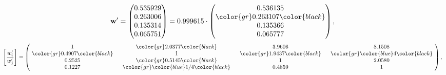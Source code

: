 \begin{example}
\begin{equation*}
\mathbf{w}^{\prime} =
\begin{pmatrix}
0.535929\\
0.263006\\
0.135314\\
0.065751
\end{pmatrix} =
0.999615\cdot
\begin{pmatrix}
0.536135\\
\color{gr} 0.263107\color{black} \\
0.135366\\
0.065777
\end{pmatrix},
\end{equation*}
\begin{equation*}
\left[ \frac{{w}^{\prime}_i}{{w}^{\prime}_j} \right] =
\begin{pmatrix}
$\,\,$ 1 $\,\,$ & $\,\,$\color{gr} 2.0377\color{black} $\,\,$ & $\,\,$3.9606$\,\,$ & $\,\,$8.1508$\,\,$ \\
$\,\,$\color{gr} 0.4907\color{black} $\,\,$ & $\,\,$ 1 $\,\,$ & $\,\,$\color{gr} 1.9437\color{black} $\,\,$ & $\,\,$\color{gr} \color{blue} 4\color{black}   $\,\,$ \\
$\,\,$0.2525$\,\,$ & $\,\,$\color{gr} 0.5145\color{black} $\,\,$ & $\,\,$ 1 $\,\,$ & $\,\,$2.0580 $\,\,$ \\
$\,\,$0.1227$\,\,$ & $\,\,$\color{gr} \color{blue}  1/4\color{black} $\,\,$ & $\,\,$0.4859$\,\,$ & $\,\,$ 1  $\,\,$ \\
\end{pmatrix},
\end{equation*}
\end{example}
\newpage
